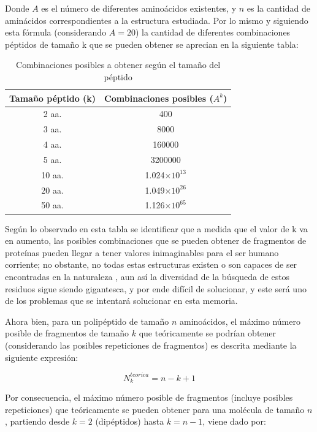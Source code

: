 Donde $A$ es el número de diferentes aminoácidos existentes, y $n$ es la cantidad de aminácidos correspondientes a la estructura estudiada. Por lo mismo y siguiendo esta fórmula (considerando $A=20$) la cantidad de diferentes combinaciones péptidos de tamaño k que se pueden obtener se aprecian en la siguiente tabla:

\begin{table}[H]
\centering
\label{my-label2}
\begin{tabular}{|c|c|}
\hline
Tamaño péptido (k) & \multicolumn{1}{c|}{Combinaciones posibles ($A^{k}$)}  \\ \hline
2 aa.     & 400        \\
3 aa.     & 8000                         \\
4 aa.      &      160000                             \\
5 aa.      &   3200000       \\
10 aa.      &   1.024$\times 10^{13}$       \\
20 aa.      &   1.049$\times 10^{26}$       \\
50 aa.   &     1.126$\times 10^{65}$   \\ \hline
\end{tabular}
\caption{Combinaciones posibles a obtener según el tamaño del péptido}
\end{table}

Según lo observado en esta tabla se identificar que a medida que el valor de k va en aumento, las posibles combinaciones que se pueden obtener de fragmentos de proteínas pueden llegar a tener valores inimaginables para el ser humano corriente; no obstante, no todas estas estructuras existen o son capaces de ser encontradas en la naturaleza \cite{array}, aun así la diversidad de la búsqueda de estos residuos sigue siendo gigantesca, y por ende difícil de solucionar, y este será uno de los problemas que se intentará solucionar en esta memoria.

Ahora bien, para un polipéptido de tamaño $n$ aminoácidos, el máximo número posible de fragmentos de tamaño $k$ que teóricamente se podrían obtener (considerando las posibles repeticiones de fragmentos) es descrita mediante la siguiente expresión:

\begin{equation}
N_{k}^{teorica}=n-k+1
\end{equation}

Por consecuencia, el máximo número posible de fragmentos (incluye posibles repeticiones) que teóricamente se pueden obtener para una molécula de tamaño $n$, partiendo desde $k=2$ (dipéptidos) hasta $k=n-1$, viene dado por:

